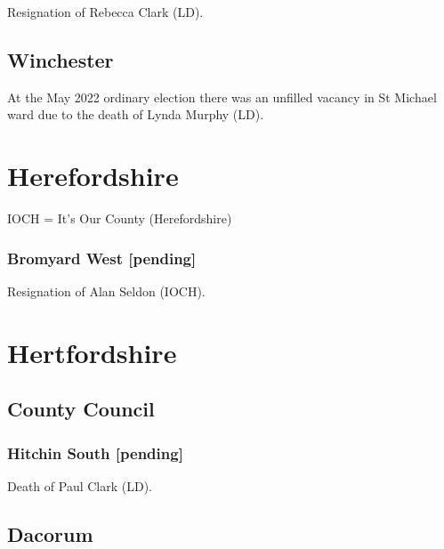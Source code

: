 \documentclass[a4paper,openany]{book}
\begin{document}
\begin{resultsiii}

Resignation of Rebecca Clark (LD).

\subsection*{Winchester}

At the May 2022 ordinary election there was an unfilled vacancy in St Michael ward due to the death of Lynda Murphy (LD).

\section{Herefordshire}

IOCH = It's Our County (Herefordshire)

\subsubsection*{Bromyard West \hspace*{\fill}\nolinebreak[1]%
	\enspace\hspace*{\fill}
	[pending]}


Resignation of Alan Seldon (IOCH).

\section{Hertfordshire}

\subsection*{County Council}

\subsubsection*{Hitchin South \hspace*{\fill}\nolinebreak[1]%
	\enspace\hspace*{\fill}
	[pending]}


Death of Paul Clark (LD).

\subsection*{Dacorum}


\end{resultsiii}
\end{document}
